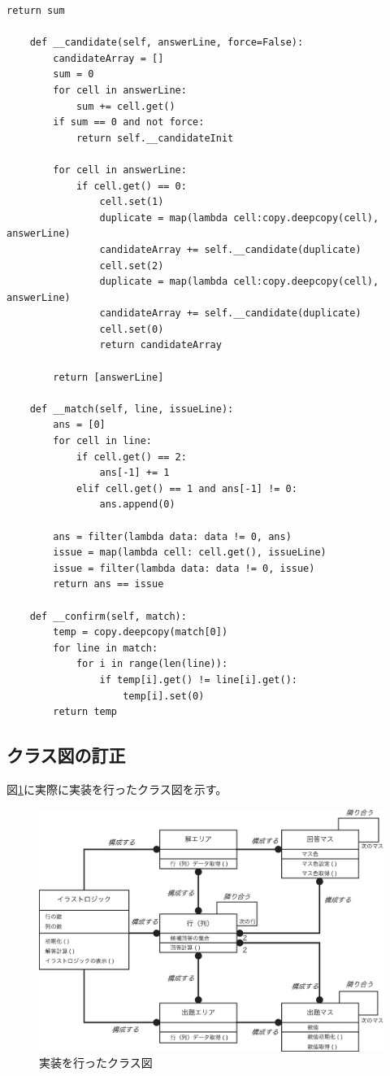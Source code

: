 \documentclass[a4j]{jarticle}
\begin{document}
\begin{lstlisting}[basicstyle=\ttfamily\footnotesize, frame=single]
        return sum

    def __candidate(self, answerLine, force=False):
        candidateArray = []
        sum = 0
        for cell in answerLine:
            sum += cell.get()
        if sum == 0 and not force:
            return self.__candidateInit

        for cell in answerLine:
            if cell.get() == 0:
                cell.set(1)
                duplicate = map(lambda cell:copy.deepcopy(cell), answerLine)
                candidateArray += self.__candidate(duplicate)
                cell.set(2)
                duplicate = map(lambda cell:copy.deepcopy(cell), answerLine)
                candidateArray += self.__candidate(duplicate)
                cell.set(0)
                return candidateArray

        return [answerLine]

    def __match(self, line, issueLine):
        ans = [0]
        for cell in line:
            if cell.get() == 2:
                ans[-1] += 1
            elif cell.get() == 1 and ans[-1] != 0:
                ans.append(0)

        ans = filter(lambda data: data != 0, ans)
        issue = map(lambda cell: cell.get(), issueLine)
        issue = filter(lambda data: data != 0, issue)
        return ans == issue

    def __confirm(self, match):
        temp = copy.deepcopy(match[0])
        for line in match:
            for i in range(len(line)):
                if temp[i].get() != line[i].get():
                    temp[i].set(0)
        return temp
\end{lstlisting}

\subsection{クラス図の訂正}
図\ref{fig:class-true}に実際に実装を行ったクラス図を示す。

\begin{figure}[hp]
\centering
\includegraphics[width=15cm]{./image/class-true.eps}
\caption{実装を行ったクラス図}
\label{fig:class-true}
\end{figure}
\end{document}
